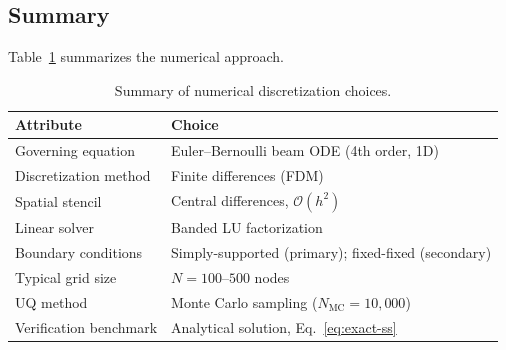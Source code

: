 \subsection{Summary}

Table~\ref{tab:numerical-summary} summarizes the numerical approach.

\begin{table}[ht]
\centering
\caption{Summary of numerical discretization choices.}
\label{tab:numerical-summary}
\begin{tabular}{ll}
\toprule
\textbf{Attribute} & \textbf{Choice} \\
\midrule
Governing equation & Euler--Bernoulli beam ODE (4th order, 1D) \\
Discretization method & Finite differences (FDM) \\
Spatial stencil & Central differences, $\mathcal{O}(h^2)$ \\
Linear solver & Banded LU factorization \\
Boundary conditions & Simply-supported (primary); fixed-fixed (secondary) \\
Typical grid size & $N = 100$--$500$ nodes \\
UQ method & Monte Carlo sampling ($N_{\text{MC}} = 10{,}000$) \\
Verification benchmark & Analytical solution, Eq.~\eqref{eq:exact-ss} \\
\bottomrule
\end{tabular}
\end{table}
